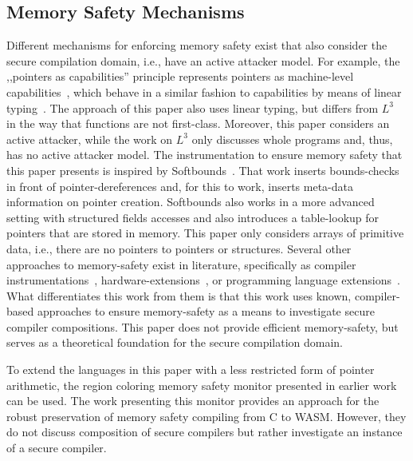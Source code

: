 \documentclass[dvipsnames,conference]{IEEEtran}
\theoremstyle{definition}
\begin{document}
\subsection{Memory Safety Mechanisms}\label{subsec:relw:msmechs}

Different mechanisms for enforcing memory safety exist that also consider the secure compilation domain, i.e., have an active attacker model.
For example, the ,,pointers as capabilities'' principle represents pointers as machine-level capabilities~\cite{korashy2021capableptrs}, which behave in a similar fashion to capabilities by means of linear typing~\cite{morrisett2005L3}.
The approach of this paper also uses linear typing, but differs from $L^{3}$~\cite{morrisett2005L3} in the way that functions are not first-class.
Moreover, this paper considers an active attacker, while the work on $L^{3}$ only discusses whole programs and, thus, has no active attacker model.
The instrumentation to ensure memory safety that this paper presents is inspired by Softbounds~\cite{nagarakatte2009soft}.
That work inserts bounds-checks in front of pointer-dereferences and, for this to work, inserts meta-data information on pointer creation.
Softbounds also works in a more advanced setting with structured fields accesses and also introduces a table-lookup for pointers that are stored in memory.
This paper only considers arrays of primitive data, i.e., there are no pointers to pointers or structures.
Several other approaches to memory-safety exist in literature, specifically as compiler instrumentations~\cite{akritidis2009baggy,younan2010paricheck,jung2021pico,shankaranarayana2023tailcheck,dhumbumroong2020boundwarden,nam2019framer,zhou2023fatptrs}, hardware-extensions~\cite{kwon2013lowfat,saileshwar2022heapcheck,chen2023flexpointer,kim2023whistle}, or programming language extensions~\cite{elliott2018checkedc,li2022formalcheckedc,jim2002cyclone,elliott2015guilt,west2005cuckoo,weis2019fyr,benoit2019uniqueness}.
What differentiates this work from them is that this work uses known, compiler-based approaches to ensure memory-safety as a means to investigate secure compiler compositions.
This paper does not provide efficient memory-safety, but serves as a theoretical foundation for the secure compilation domain.

To extend the languages in this paper with a less restricted form of pointer arithmetic, the region coloring memory safety monitor presented in earlier work~\cite{michael2023mswasm} can be used.
The work presenting this monitor provides an approach for the robust preservation of memory safety compiling from C to WASM.
However, they do not discuss composition of secure compilers but rather investigate an instance of a secure compiler.
\end{document}
